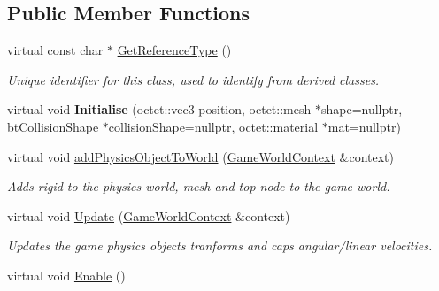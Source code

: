 \subsection*{Public Member Functions}
\begin{DoxyCompactItemize}
\item 
\hypertarget{class_arena_1_1_physics_object_af0cdd9b1d59e30eba7101916e4de2c52}{virtual const char $\ast$ \hyperlink{class_arena_1_1_physics_object_af0cdd9b1d59e30eba7101916e4de2c52}{Get\+Reference\+Type} ()}\label{class_arena_1_1_physics_object_af0cdd9b1d59e30eba7101916e4de2c52}

\begin{DoxyCompactList}\small\item\em Unique identifier for this class, used to identify from derived classes. \end{DoxyCompactList}\item 
\hypertarget{class_arena_1_1_physics_object_a1c047cab77a4d7f8555c3f1bed3cea86}{virtual void {\bfseries Initialise} (octet\+::vec3 position, octet\+::mesh $\ast$shape=nullptr, bt\+Collision\+Shape $\ast$collision\+Shape=nullptr, octet\+::material $\ast$mat=nullptr)}\label{class_arena_1_1_physics_object_a1c047cab77a4d7f8555c3f1bed3cea86}

\item 
\hypertarget{class_arena_1_1_physics_object_a34ee0dacb9dff05dde46fbf99672f40c}{virtual void \hyperlink{class_arena_1_1_physics_object_a34ee0dacb9dff05dde46fbf99672f40c}{add\+Physics\+Object\+To\+World} (\hyperlink{struct_arena_1_1_game_world_context}{Game\+World\+Context} \&context)}\label{class_arena_1_1_physics_object_a34ee0dacb9dff05dde46fbf99672f40c}

\begin{DoxyCompactList}\small\item\em Adds rigid to the physics world, mesh and top node to the game world. \end{DoxyCompactList}\item 
\hypertarget{class_arena_1_1_physics_object_a3efbef8665fee4e50cc19d5202292eee}{virtual void \hyperlink{class_arena_1_1_physics_object_a3efbef8665fee4e50cc19d5202292eee}{Update} (\hyperlink{struct_arena_1_1_game_world_context}{Game\+World\+Context} \&context)}\label{class_arena_1_1_physics_object_a3efbef8665fee4e50cc19d5202292eee}

\begin{DoxyCompactList}\small\item\em Updates the game physics objects tranforms and caps angular/linear velocities. \end{DoxyCompactList}\item 
\hypertarget{class_arena_1_1_physics_object_a0d10de17213299177cd2b10499d9f038}{virtual void \hyperlink{class_arena_1_1_physics_object_a0d10de17213299177cd2b10499d9f038}{Enable} ()}\label{class_arena_1_1_physics_object_a0d10de17213299177cd2b10499d9f038}


\end{DoxyCompactItemize}
